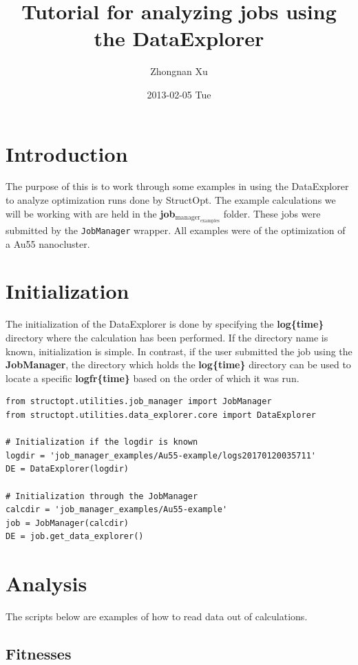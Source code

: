 \documentclass[11pt]{article}
\author{Zhongnan Xu}
\date{2013-02-05 Tue}
\title{Tutorial for analyzing jobs using the DataExplorer}
\begin{document}
\maketitle
\tableofcontents

\section{Introduction}
\label{sec:orgheadline1}
The purpose of this is to work through some examples in using the DataExplorer to analyze optimization runs done by StructOpt. The example calculations we will be working with are held in the \textbf{job\(_{\text{manager}}_{\text{examples}}\)} folder. These jobs were submitted by the \texttt{JobManager} wrapper. All examples were of the optimization of a Au55 nanocluster.

\section{Initialization}
\label{sec:orgheadline2}
The initialization of the DataExplorer is done by specifying the \textbf{log\{time\}} directory where the calculation has been performed. If the directory name is known, initialization is simple. In contrast, if the user submitted the job using the \textbf{JobManager}, the directory which holds the \textbf{log\{time\}} directory can be used to locate a specific \textbf{logfr\{time\}} based on the order of which it was run.

\begin{verbatim}
from structopt.utilities.job_manager import JobManager
from structopt.utilities.data_explorer.core import DataExplorer

# Initialization if the logdir is known
logdir = 'job_manager_examples/Au55-example/logs20170120035711'
DE = DataExplorer(logdir)

# Initialization through the JobManager
calcdir = 'job_manager_examples/Au55-example'
job = JobManager(calcdir)
DE = job.get_data_explorer()
\end{verbatim}

\section{Analysis}
\label{sec:orgheadline7}
The scripts below are examples of how to read data out of calculations.

\subsection{Fitnesses}
\label{sec:orgheadline4}
\end{document}
